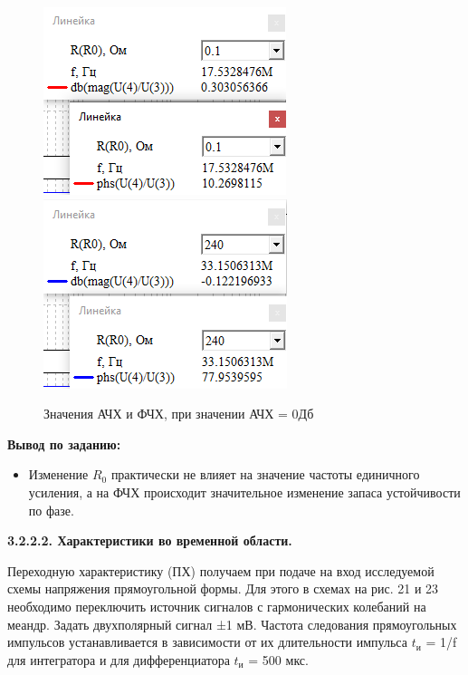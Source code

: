 \documentclass[a4paper,14pt]{extarticle}
\begin{document}
    \begin{figure}[h!]
        \begin{center}
           \includegraphics[scale=0.8]{26.png}
           \includegraphics[scale=0.8]{27.png}           
        \end{center}
        \vspace{-0.7cm}
        \caption{Значения АЧХ и ФЧХ, при значении АЧХ = 0Дб}
        \vspace{-0.5cm}
    \end{figure}   

    \vspace{1.5cm}
    \textbf{Вывод по заданию:}

    \begin{itemize}
        \item Изменение $R_0$ практически не влияет на значение частоты единичного усиления, а на ФЧХ происходит значительное изменение запаса устойчивости по фазе.
    \end{itemize}
 
    \begin{center}
        \textbf{3.2.2.2. Характеристики во временной области.}
    \end{center}

    Переходную характеристику (ПХ) получаем при подаче на вход исследуемой 
    схемы напряжения прямоугольной формы. Для этого в схемах на рис. 21 и 
    23 необходимо переключить источник сигналов с гармонических колебаний 
    на меандр. Задать двухполярный сигнал ±1 мВ. Частота следования 
    прямоугольных импульсов устанавливается в зависимости от их 
    длительности импульса $t_\text{и}$ = 1/f для интегратора и для 
    дифференциатора $t_\text{и}$ = 500 мкс.
\end{document}
